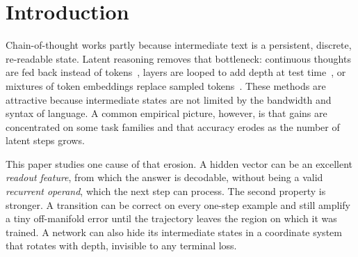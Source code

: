 \documentclass[11pt]{article}
\theoremstyle{definition}
\theoremstyle{remark}
\begin{document}
\section{Introduction}

Chain-of-thought works partly because intermediate text is a persistent, discrete, re-readable
state. Latent reasoning removes that bottleneck: continuous thoughts are fed back instead of
tokens~\cite{coconut}, layers are looped to add depth at test time~\cite{ut,geiping,looped}, or
mixtures of token embeddings replace sampled tokens~\cite{softthinking}. These methods are
attractive because intermediate states are not limited by the bandwidth and syntax of language.
A common empirical picture, however, is that gains are concentrated on some task families and
that accuracy erodes as the number of latent steps grows.

This paper studies one cause of that erosion. A hidden vector can be an excellent
\emph{readout feature}, from which the answer is decodable, without being a valid \emph{recurrent
operand}, which the next step can process. The second property is stronger. A transition can be
correct on every one-step example and still amplify a tiny off-manifold error until the
trajectory leaves the region on which it was trained. A network can also hide its intermediate
states in a coordinate system that rotates with depth, invisible to any terminal loss.
\end{document}
